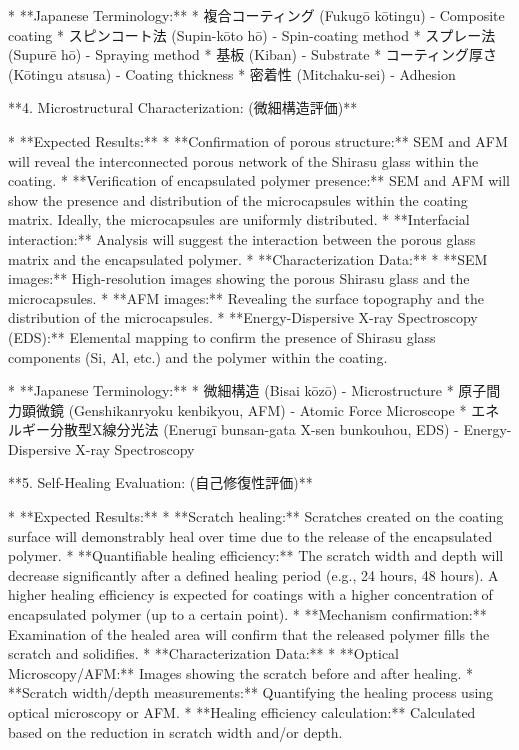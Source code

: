 \documentclass{article}
\begin{document}
*   **Japanese Terminology:**
    *   複合コーティング (Fukugō kōtingu) - Composite coating
    *   スピンコート法 (Supin-kōto hō) - Spin-coating method
    *   スプレー法 (Supurē hō) - Spraying method
    *   基板 (Kiban) - Substrate
    *   コーティング厚さ (Kōtingu atsusa) - Coating thickness
    *   密着性 (Mitchaku-sei) - Adhesion

**4. Microstructural Characterization: (微細構造評価)**

*   **Expected Results:**
    *   **Confirmation of porous structure:** SEM and AFM will reveal the interconnected porous network of the Shirasu glass within the coating.
    *   **Verification of encapsulated polymer presence:** SEM and AFM will show the presence and distribution of the microcapsules within the coating matrix. Ideally, the microcapsules are uniformly distributed.
    *   **Interfacial interaction:**  Analysis will suggest the interaction between the porous glass matrix and the encapsulated polymer.
    *   **Characterization Data:**
        *   **SEM images:** High-resolution images showing the porous Shirasu glass and the microcapsules.
        *   **AFM images:**  Revealing the surface topography and the distribution of the microcapsules.
        *   **Energy-Dispersive X-ray Spectroscopy (EDS):** Elemental mapping to confirm the presence of Shirasu glass components (Si, Al, etc.) and the polymer within the coating.

*   **Japanese Terminology:**
    *   微細構造 (Bisai kōzō) - Microstructure
    *   原子間力顕微鏡 (Genshikanryoku kenbikyou, AFM) - Atomic Force Microscope
    *   エネルギー分散型X線分光法 (Enerugī bunsan-gata X-sen bunkouhou, EDS) - Energy-Dispersive X-ray Spectroscopy

**5. Self-Healing Evaluation: (自己修復性評価)**

*   **Expected Results:**
    *   **Scratch healing:** Scratches created on the coating surface will demonstrably heal over time due to the release of the encapsulated polymer.
    *   **Quantifiable healing efficiency:** The scratch width and depth will decrease significantly after a defined healing period (e.g., 24 hours, 48 hours).  A higher healing efficiency is expected for coatings with a higher concentration of encapsulated polymer (up to a certain point).
    *   **Mechanism confirmation:** Examination of the healed area will confirm that the released polymer fills the scratch and solidifies.
    *   **Characterization Data:**
        *   **Optical Microscopy/AFM:** Images showing the scratch before and after healing.
        *   **Scratch width/depth measurements:**  Quantifying the healing process using optical microscopy or AFM.
        *   **Healing efficiency calculation:**  Calculated based on the reduction in scratch width and/or depth.
\end{document}
